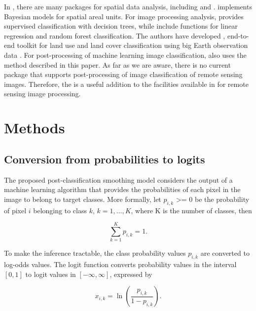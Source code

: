 \documentclass[
  shortnames]{jss}
\begin{document}
In , there are many packages for spatial data analysis, including  \citep{Bivand2023} and  \citep{Li2022}.  \citep{Lee2013} implements Bayesian models for spatial areal units. For image processing analysis,  \citep{Hijmans2023} provides supervised classification with decision trees, while  \citep{Bivand2023} include functions for linear regression and random forest classification. The authors have developed , end-to-end toolkit for land use and land cover classification using big Earth observation data \citep{Simoes2021}. For post-processing of machine learning image classification,  also uses the method described in this paper. As far as we are aware, there is no current  package that supports post-processing of image classification of remote sensing images. Therefore, the  is a useful addition to the facilities available in  for remote sensing image processing.

\hypertarget{methods}{%
\section{Methods}\label{methods}}

\hypertarget{conversion-from-probabilities-to-logits}{%
\subsection{Conversion from probabilities to logits}\label{conversion-from-probabilities-to-logits}}

The proposed post-classification smoothing model considers the output of a machine learning algorithm that provides the probabilities of each pixel in the image to belong to target classes. More formally, let \(p_{i,k}\) \textgreater= 0 be the probability of pixel \(i\) belonging to class \(k\), \(k=1,\dots{},K\), where K is the number of classes, then

\begin{equation}
\sum_{k=1}^K p_{i,k} = 1.
\end{equation}

To make the inference tractable, the class probability values \(p_{i,k}\) are converted to log-odds values. The logit function converts probability values in the interval \([0,1]\) to logit values in \([-\infty, \infty]\), expressed by

\begin{equation}
x_{i,k} = \ln \left(\frac{p_{i,k}}{1 - p_{i,k}}\right).
\end{equation}
\end{document}

